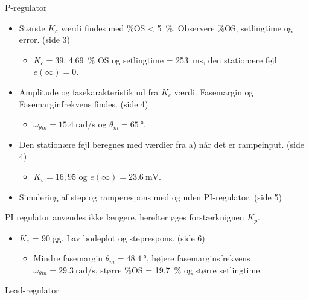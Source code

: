 \documentclass[danish]{article}
\begin{document}
\vspace{3mm}
P-regulator
\begin{itemize}
	\item Største $K_c$ værdi findes med $\si{\percent}$OS < \SI{5}{\percent}. Observere $\si{\percent}$OS, setlingtime og error. (side 3)
	\begin{itemize}
		\item $K_c = 39$, \SI{4,69}{\percent} OS og setlingtime = \SI{253}{\milli\second}, den stationære fejl $e(\infty) = 0$.
	\end{itemize}
	\item Amplitude og fasekarakteristik ud fra $K_c$ værdi. Fasemargin og Fasemarginfrekvens findes. (side 4)
	\begin{itemize}
		\item $\omega_{\theta m} = \SI{15,4}{\radian\per\second}$  og  $\theta_m = \SI{65}{\degree}$.
	\end{itemize}
	\item Den stationære fejl beregnes med værdier fra a) når det er rampeinput. (side 4)
	\begin{itemize}
		\item $K_v = 16,95$ og $e(\infty) = \SI{23,6}{\milli\volt}$.
	\end{itemize}
	\item Simulering af step og ramperespons med og uden PI-regulator. (side 5)
\end{itemize}
\vspace{3mm}
PI regulator anvendes ikke længere, herefter øges forstærknignen $K_p$. 
\begin{itemize}
	\item $K_c$ = 90 gg. Lav bodeplot og steprespons. (side 6)
	\begin{itemize}
		\item Mindre fasemargin $\theta_m = \SI{48,4}{\degree}$, højere fasemarginsfrekvens $\omega_{\theta m} = \SI{29,3}{\radian\per\second}$, større $\si{\percent}$OS = \SI{19,7}{\percent} og større setlingtime.
	\end{itemize}
\end{itemize}
\vspace{3mm}
Lead-regulator
\end{document}
